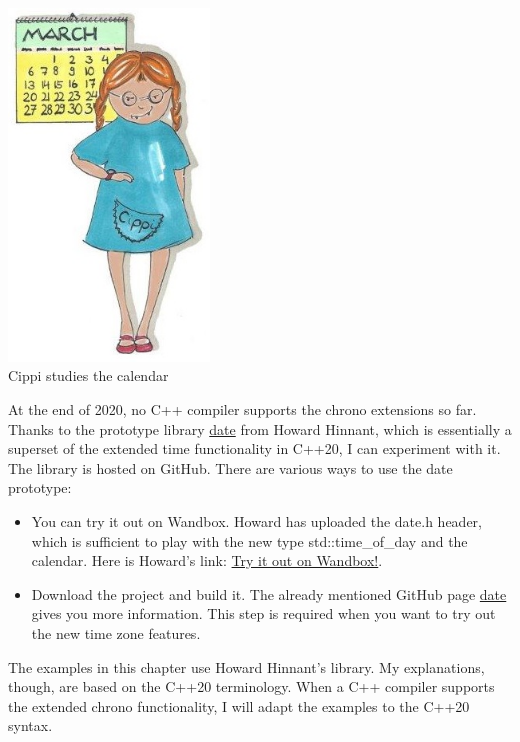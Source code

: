 \begin{center}
\includegraphics[width=0.4\textwidth]{content/3/chapter5/images/18.png}\\
Cippi studies the calendar
\end{center}

\begin{tcolorbox}[colback=blue!5!white,colframe=blue!75!black,title={Lack of Compiler Support}]
	
At the end of 2020, no C++ compiler supports the chrono extensions so far. Thanks to the prototype library \href{https://github.com/HowardHinnant/date}{date} from Howard Hinnant, which is essentially a superset of the extended time functionality in C++20, I can experiment with it. The library is hosted on GitHub. There are various ways to use the date prototype:

\begin{itemize}
\item 
You can try it out on Wandbox. Howard has uploaded the date.h header, which is sufficient to play with the new type std::time\_of\_day and the calendar. Here is Howard’s link: \href{https://wandbox.org/permlink/L8MwjzSSC3fXXrMd}{Try it out on Wandbox!}.

\item 
Download the project and build it. The already mentioned GitHub page \href{https://github.com/HowardHinnant/date}{date} gives you more information. This step is required when you want to try out the new time zone features.
\end{itemize}

The examples in this chapter use Howard Hinnant’s library. My explanations, though, are based on the C++20 terminology. When a C++ compiler supports the extended chrono functionality, I will adapt the examples to the C++20 syntax.

\end{tcolorbox}

